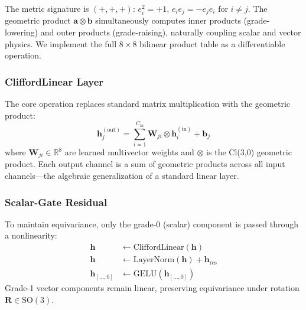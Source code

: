\documentclass[journal]{IEEEtran}
\begin{document}
The metric signature is $(+,+,+)$: $e_i^2 = +1$, $e_i e_j = -e_j e_i$ for $i \neq j$. The geometric product $\bm{a} \otimes \bm{b}$ simultaneously computes inner products (grade-lowering) and outer products (grade-raising), naturally coupling scalar and vector physics. We implement the full $8 \times 8$ bilinear product table as a differentiable operation.

\subsubsection{CliffordLinear Layer}
The core operation replaces standard matrix multiplication with the geometric product:
\begin{equation}
\bm{h}_j^{(\text{out})} = \sum_{i=1}^{C_\text{in}} \bm{W}_{ji} \otimes \bm{h}_i^{(\text{in})} + \bm{b}_j
\label{eq:clifford_linear}
\end{equation}
where $\bm{W}_{ji} \in \mathbb{R}^8$ are learned multivector weights and $\otimes$ is the Cl(3,0) geometric product. Each output channel is a sum of geometric products across all input channels---the algebraic generalization of a standard linear layer.

\subsubsection{Scalar-Gate Residual}
To maintain equivariance, only the grade-0 (scalar) component is passed through a nonlinearity:
\begin{align}
\bm{h} &\leftarrow \text{CliffordLinear}(\bm{h}) \\
\bm{h} &\leftarrow \text{LayerNorm}(\bm{h}) + \bm{h}_\text{res} \\
\bm{h}_{[\ldots, 0]} &\leftarrow \text{GELU}(\bm{h}_{[\ldots, 0]}) \label{eq:scalar_gate}
\end{align}
Grade-1 vector components remain linear, preserving equivariance under rotation $\bm{R} \in \text{SO}(3)$.
\end{document}
